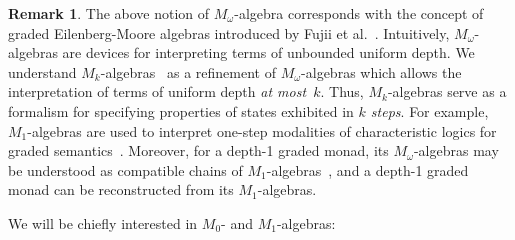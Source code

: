 \documentclass[sigconf,
			final%
			nonacm
                        ]{acmart}
\numberwithin{equation}{section}
\numberwithin{equation}{section}
\theoremstyle{plain}
\theoremstyle{definition}
\newtheorem{rem}[thm]{Remark}
\begin{document}
\begin{rem}
  The above notion of $M_{\omega}$-algebra corresponds with the
  concept of graded Eilenberg-Moore algebras introduced by Fujii et
  al.~\cite{FKM16}. Intuitively, $M_{\omega}$-algebras are devices for
  interpreting terms of unbounded uniform depth. We understand
  $M_k$-algebras~\cite{MPS15} as a refinement of $M_{\omega}$-algebras
  which allows the interpretation of terms of uniform depth \emph{at
  most~$k$}. Thus, $M_k$-algebras serve as a formalism for
  specifying properties of states exhibited in \emph{$k$ steps}. For
  example, $M_1$-algebras are used to interpret one-step modalities of
  characteristic logics for graded semantics~\cite{DMS19,FMS21a}.
  Moreover, for a depth-1 graded monad, its $M_\omega$-algebras may
  be understood as compatible chains of $M_1$-algebras~\cite{MPS15},
  and  %
  a depth-1 graded monad can be reconstructed from its $M_1$-algebras.
\end{rem}

\noindent We will be chiefly interested in $M_0$- and $M_1$-algebras:
\end{document}
